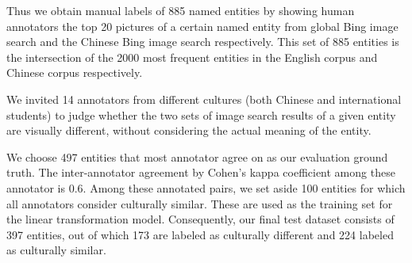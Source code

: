 
%


Thus we obtain manual labels of 885 named
entities by
showing human annotators the top 20 pictures of a certain
named entity from global Bing image search and the Chinese Bing image
search respectively.
This set of 885 entities is the intersection of the 2000 most frequent
entities in the English corpus and Chinese corpus respectively.

We invited 14 annotators from different cultures (both Chinese and
international students) to judge whether the two sets of image search results
of a given entity are visually different, without considering the actual
meaning of the entity.


We choose 497 entities that most annotator agree on as
our evaluation ground truth. The inter-annotator  agreement by
Cohen's kappa coefficient among these annotator is 0.6.
Among these annotated pairs,
we set aside 100 entities for which all annotators consider culturally similar.
These are used as the training set for the linear transformation model.
Consequently, our final test dataset consists of 397 entities,
out of which 173 are labeled as culturally different and 224 labeled
as culturally similar.

